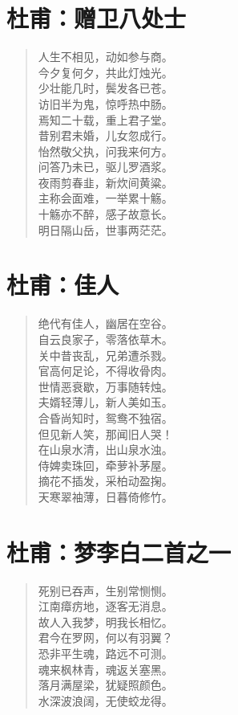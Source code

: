 \documentclass[12pt,oneside]{book}
\newenvironment{shici}{%
\begin{verse}\centering\yanti\large\hspace{12pt}}{\end{verse}}
\begin{document}
\begin{common-format}
\chapter{杜甫：赠卫八处士}
\begin{shici}
人生不相见，动如参与商。\\
今夕复何夕，共此灯烛光。\\
少壮能几时，鬓发各已苍。\\
访旧半为鬼，惊呼热中肠。\\
焉知二十载，重上君子堂。\\
昔别君未婚，儿女忽成行。\\
怡然敬父执，问我来何方。\\
问答乃未已，驱儿罗酒浆。\\
夜雨剪春韭，新炊间黄粱。\\
主称会面难，一举累十觞。\\
十觞亦不醉，感子故意长。\\
明日隔山岳，世事两茫茫。
\end{shici}


\chapter{杜甫：佳人}
\begin{shici}
绝代有佳人，幽居在空谷。\\
自云良家子，零落依草木。\\
关中昔丧乱，兄弟遭杀戮。\\
官高何足论，不得收骨肉。\\
世情恶衰歇，万事随转烛。\\
夫婿轻薄儿，新人美如玉。\\
合昏尚知时，鸳鸯不独宿。\\
但见新人笑，那闻旧人哭！\\
在山泉水清，出山泉水浊。\\
侍婢卖珠回，牵萝补茅屋。\\
摘花不插发，采柏动盈掬。\\
天寒翠袖薄，日暮倚修竹。
\end{shici}

\chapter{杜甫：梦李白二首之一}
\begin{shici}
死别已吞声，生别常恻恻。\\
江南瘴疠地，逐客无消息。\\
故人入我梦，明我长相忆。\\
君今在罗网，何以有羽翼？\\
恐非平生魂，路远不可测。\\
魂来枫林青，魂返关塞黑。\\
落月满屋梁，犹疑照颜色。\\
水深波浪阔，无使蛟龙得。
\end{shici}




\end{common-format}
\end{document}
